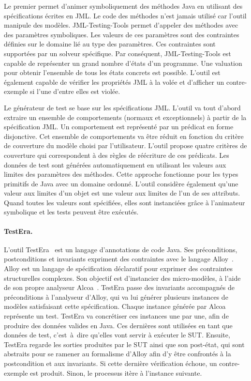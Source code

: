Le premier permet d'animer symboliquement des méthodes Java en utilisant des
spécifications écrites en JML. Le code des méthodes n'est jamais utilisé car
l'outil manipule des modèles. JML-Testing-Tools permet d'appeler des méthodes
avec des paramètres symboliques. Les valeurs de ces paramètres sont des
contraintes définies sur le domaine lié au type des paramètres. Ces contraintes
sont supportées par un solveur spécifique. Par conséquent, JML-Testing-Tools est
capable de représenter un grand nombre d'états d'un programme. Une valuation
pour obtenir l'ensemble de tous les états concrets est possible. L'outil est
également capable de vérifier les propriétés JML à la volée et d'afficher un
contre-exemple si l'une d'entre elles est violée.

Le générateur de test se base sur les spécifications JML. L'outil va tout
d'abord extraire un ensemble de comportements (normaux et exceptionnels) à
partir de la spécification JML. Un comportement est représenté par un prédicat
en forme disjonctive. Cet ensemble de comportements va être réduit en fonction
du critère de couverture du modèle choisi par l'utilisateur. L'outil propose
quatre critères de couverture qui correspondent à des règles de réécriture de
ces prédicats. Les données de test sont générées automatiquement en utilisant
les valeurs aux limites des paramètres des méthodes. Cette approche fonctionne
pour les types primitifs de Java avec un domaine ordonné. L'outil considère
également qu'une valeur aux limites d'un objet est une valeur aux limites de
l'un de ses attributs. Quand toutes les valeurs sont spécifiées, elles sont
instanciées grâce à l'animateur symbolique et les tests peuvent être exécutés.

\paragraph{TestEra.} L'outil TestEra~ est un langage
d'annotations de code Java. Ses préconditions, postconditions et invariants
expriment des contraintes avec le langage Alloy~. Alloy est un
langage de spécification déclaratif pour exprimer des contraintes structurelles
complexes. Son objectif est d'instancier des micro-modèles, à l'aide de son
propre analyseur Alcoa~. TestEra passe des invariants
accompagnés de préconditions à l'analyseur d'Alloy, qui va lui générer plusieurs
instances de modèles satisfaisant cette spécification. Chaque instance générée
par Alcoa représente un test. TestEra va concrétiser ces instances une par une,
afin de produire des données valides en Java. Ces dernières sont utilisées en
tant que données de test, c'est~à~dire qu'elles vont servir à exécuter le SUT.
Ensuite, TestEra regarde les sorties produites par le SUT ainsi que son
post-état, qui sont abstraits pour se ramener au formalisme d'Alloy afin d'y
être confrontés à la postcondition et aux invariants. Si cette dernière
vérification échoue, un contre-exemple est produit. Sinon, le processus itère à
l'instance suivante.

